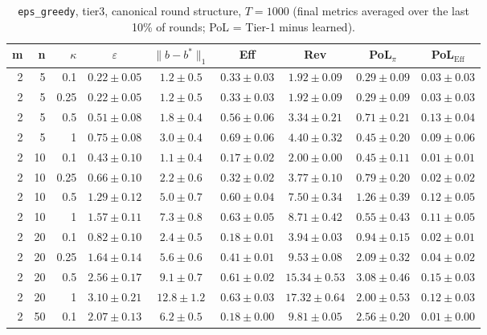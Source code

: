 \begin{table}[htbp]
\centering
\scriptsize
\caption{\texttt{eps\_greedy}, tier3, canonical round structure, $T=1000$ (final metrics averaged over the last 10\% of rounds; PoL = Tier-1 minus learned).}
\label{tab:tier3_eps_greedy_canonical}
\begin{tabular}{@{}rrrcccccc@{}}
\toprule
m & n & $\kappa$ & $\varepsilon$ & $\|b-b^*\|_1$ & Eff & Rev & PoL$_\pi$ & PoL$_\mathrm{Eff}$ \\
\midrule
2 & 5 & 0.1 & $0.22 \pm 0.05$ & $1.2 \pm 0.5$ & $0.33 \pm 0.03$ & $1.92 \pm 0.09$ & $0.29 \pm 0.09$ & $0.03 \pm 0.03$ \\
2 & 5 & 0.25 & $0.22 \pm 0.05$ & $1.2 \pm 0.5$ & $0.33 \pm 0.03$ & $1.92 \pm 0.09$ & $0.29 \pm 0.09$ & $0.03 \pm 0.03$ \\
2 & 5 & 0.5 & $0.51 \pm 0.08$ & $1.8 \pm 0.4$ & $0.56 \pm 0.06$ & $3.34 \pm 0.21$ & $0.71 \pm 0.21$ & $0.13 \pm 0.04$ \\
2 & 5 & 1 & $0.75 \pm 0.08$ & $3.0 \pm 0.4$ & $0.69 \pm 0.06$ & $4.40 \pm 0.32$ & $0.45 \pm 0.20$ & $0.09 \pm 0.06$ \\
2 & 10 & 0.1 & $0.43 \pm 0.10$ & $1.1 \pm 0.4$ & $0.17 \pm 0.02$ & $2.00 \pm 0.00$ & $0.45 \pm 0.11$ & $0.01 \pm 0.01$ \\
2 & 10 & 0.25 & $0.66 \pm 0.10$ & $2.2 \pm 0.6$ & $0.32 \pm 0.02$ & $3.77 \pm 0.10$ & $0.79 \pm 0.20$ & $0.02 \pm 0.02$ \\
2 & 10 & 0.5 & $1.29 \pm 0.12$ & $5.0 \pm 0.7$ & $0.60 \pm 0.04$ & $7.50 \pm 0.34$ & $1.26 \pm 0.39$ & $0.12 \pm 0.05$ \\
2 & 10 & 1 & $1.57 \pm 0.11$ & $7.3 \pm 0.8$ & $0.63 \pm 0.05$ & $8.71 \pm 0.42$ & $0.55 \pm 0.43$ & $0.11 \pm 0.05$ \\
2 & 20 & 0.1 & $0.82 \pm 0.10$ & $2.4 \pm 0.5$ & $0.18 \pm 0.01$ & $3.94 \pm 0.03$ & $0.94 \pm 0.15$ & $0.02 \pm 0.01$ \\
2 & 20 & 0.25 & $1.64 \pm 0.14$ & $5.6 \pm 0.6$ & $0.41 \pm 0.01$ & $9.53 \pm 0.08$ & $2.09 \pm 0.32$ & $0.04 \pm 0.02$ \\
2 & 20 & 0.5 & $2.56 \pm 0.17$ & $9.1 \pm 0.7$ & $0.61 \pm 0.02$ & $15.34 \pm 0.53$ & $3.08 \pm 0.46$ & $0.15 \pm 0.03$ \\
2 & 20 & 1 & $3.10 \pm 0.21$ & $12.8 \pm 1.2$ & $0.63 \pm 0.03$ & $17.32 \pm 0.64$ & $2.00 \pm 0.53$ & $0.12 \pm 0.03$ \\
2 & 50 & 0.1 & $2.07 \pm 0.13$ & $6.2 \pm 0.5$ & $0.18 \pm 0.00$ & $9.81 \pm 0.05$ & $2.56 \pm 0.20$ & $0.01 \pm 0.00$ \\

\end{tabular}
\end{table}

